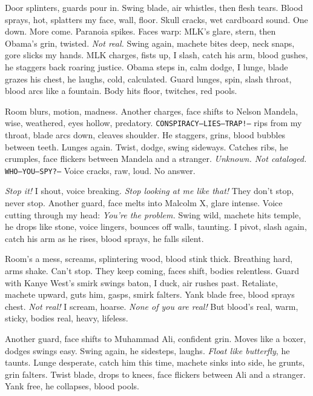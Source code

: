 \documentclass[12pt,oneside]{book} %
\newcommand{\note}[1]{\texttt{#1}}
\begin{document}
Door splinters, guards pour in. Swing blade, air whistles, then flesh tears. Blood sprays, hot, splatters my face, wall, floor. Skull cracks, wet cardboard sound. One down. More come. Paranoia spikes. Faces warp: \textnormal{MLK}’s glare, stern, then \textnormal{Obama}’s grin, twisted. \textit{Not real.} Swing again, machete bites deep, neck snaps, gore slicks my hands. \textnormal{MLK} charges, fists up, I slash, catch his arm, blood gushes, he staggers back roaring justice. \textnormal{Obama} steps in, calm dodge, I lunge, blade grazes his chest, he laughs, cold, calculated. Guard lunges, spin, slash throat, blood arcs like a fountain. Body hits floor, twitches, red pools.

Room blurs, motion, madness. Another charges, face shifts to \textnormal{Nelson Mandela}, wise, weathered, eyes hollow, predatory. \note{CONSPIRACY—LIES—TRAP!—} rips from my throat, blade arcs down, cleaves shoulder. He staggers, grins, blood bubbles between teeth. Lunges again. Twist, dodge, swing sideways. Catches ribs, he crumples, face flickers between \textnormal{Mandela} and a stranger. \textit{Unknown. Not cataloged.} \note{WHO—YOU—SPY?—} Voice cracks, raw, loud. No answer.

\textit{Stop it!} I shout, voice breaking. \textit{Stop looking at me like that!} They don’t stop, never stop. Another guard, face melts into \textnormal{Malcolm X}, glare intense. Voice cutting through my head: \textit{You’re the problem.} Swing wild, machete hits temple, he drops like stone, voice lingers, bounces off walls, taunting. I pivot, slash again, catch his arm as he rises, blood sprays, he falls silent.

Room’s a mess, screams, splintering wood, blood stink thick. Breathing hard, arms shake. Can’t stop. They keep coming, faces shift, bodies relentless. Guard with \textnormal{Kanye West}’s smirk swings baton, I duck, air rushes past. Retaliate, machete upward, guts him, gasps, smirk falters. Yank blade free, blood sprays chest. \textit{Not real!} I scream, hoarse. \textit{None of you are real!} But blood’s real, warm, sticky, bodies real, heavy, lifeless.

Another guard, face shifts to \textnormal{Muhammad Ali}, confident grin. Moves like a boxer, dodges swings easy. Swing again, he sidesteps, laughs. \textit{Float like butterfly}, he taunts. Lunge desperate, catch him this time, machete sinks into side, he grunts, grin falters. Twist blade, drops to knees, face flickers between \textnormal{Ali} and a stranger. Yank free, he collapses, blood pools.
\end{document}
